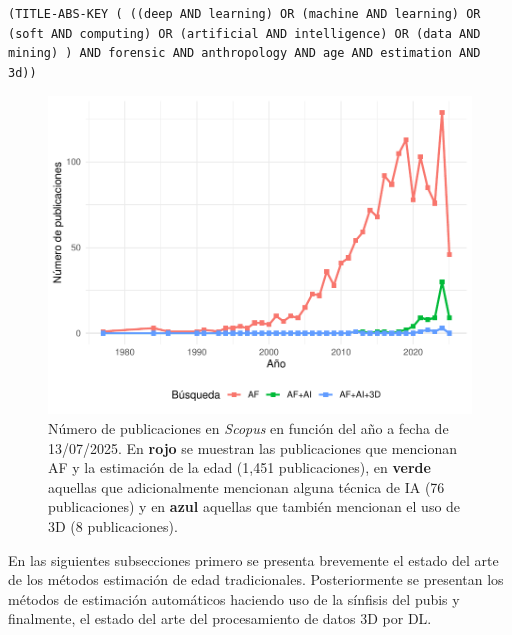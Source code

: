 \begin{lstlisting}[caption={Cadena de búsqueda de \textit{Scopus} para obtener publicaciones de AF que referencian la estimación de la edad, hacen uso de alguna técnica de IA y utilizan datos 3D.}, captionpos=b, label=code__scopus_af_ai_3d, style=Consola]
(TITLE-ABS-KEY ( ((deep AND learning) OR (machine AND learning) OR (soft AND computing) OR (artificial AND intelligence) OR (data AND mining) ) AND forensic AND anthropology AND age AND estimation AND 3d))
\end{lstlisting}

\begin{figure}[h]
    \centering
    \includegraphics[width=\linewidth]{figures/3_sota/scopus_pubs.pdf}
    \caption[Publicaciones por año de AF, AF+IA y AF+IA+3D en Scopus]{Número de publicaciones en \textit{Scopus} en función del año a fecha de 13/07/2025. En {\color{Red} \textbf{rojo}} se muestran las publicaciones que mencionan AF y la estimación de la edad (1,451 publicaciones), en {\color{LimeGreen} \textbf{verde}} aquellas que adicionalmente mencionan alguna técnica de IA (76 publicaciones) y en {\color{Blue} \textbf{azul}} aquellas que también mencionan el uso de 3D (8 publicaciones).}
    \label{fig:scopusData}
\end{figure}

En las siguientes subsecciones primero se presenta brevemente el estado del arte de los métodos estimación de edad tradicionales. Posteriormente se presentan los métodos de estimación automáticos haciendo uso de la sínfisis del pubis y finalmente, el estado del arte del procesamiento de datos 3D por DL.

